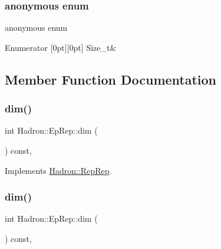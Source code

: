 \subsubsection{\texorpdfstring{anonymous enum}{anonymous enum}}
{\footnotesize\ttfamily anonymous enum}

\begin{DoxyEnumFields}{Enumerator}
[0pt][0pt]{}\mbox{\label{structHadron_1_1EpRep_a4755a8c3ebaa3e7e6dffc1ed0b1c2cd6aa251a0f4f8c253bf87c3c1d7104aa12a}} 
Size\+\_\+t&\\
\hline

\end{DoxyEnumFields}


\subsection{Member Function Documentation}
\mbox{\label{structHadron_1_1EpRep_a1c0d8b8924b0bb66325c1049fc6cd76e}} 
\subsubsection{\texorpdfstring{dim()}{dim()}\hspace{0.1cm}{\footnotesize\ttfamily [1/5]}}
{\footnotesize\ttfamily int Hadron\+::\+Ep\+Rep\+::dim (\begin{DoxyParamCaption}{ }\end{DoxyParamCaption}) const\hspace{0.3cm}{\ttfamily [inline]}, {\ttfamily [virtual]}}



Implements \mbox{\hyperlink{structHadron_1_1RepRep_a92c8802e5ed7afd7da43ccfd5b7cd92b}{Hadron\+::\+Rep\+Rep}}.

\mbox{\label{structHadron_1_1EpRep_a1c0d8b8924b0bb66325c1049fc6cd76e}} 
\subsubsection{\texorpdfstring{dim()}{dim()}\hspace{0.1cm}{\footnotesize\ttfamily [2/5]}}
{\footnotesize\ttfamily int Hadron\+::\+Ep\+Rep\+::dim (\begin{DoxyParamCaption}{ }\end{DoxyParamCaption}) const\hspace{0.3cm}{\ttfamily [inline]}, {\ttfamily [virtual]}}



